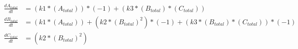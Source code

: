 \documentclass{article}
\begin{document}
\begin{align*}
\frac{dA_{total}}{dt} &= (k1*(A_{total}))*(-1) + (k3*(B_{total})*(C_{total})) \\
\frac{dB_{total}}{dt} &= (k1*(A_{total})) + (k2*(B_{total})^2)*(-1) + (k3*(B_{total})*(C_{total}))*(-1) \\
\frac{dC_{total}}{dt} &= (k2*(B_{total})^2)
\end{align*}
\end{document}
